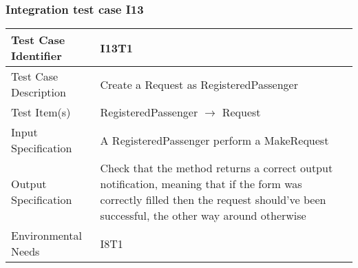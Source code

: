 		\subsubsection{Integration test case I13}
		\begin{center}
			\begin{tabular}{ |l p{10cm}| } \hline
				Test Case Identifier & I13T1 \\ \hline
				Test Case Description & Create a Request as RegisteredPassenger \\ \hline
				Test Item(s) & RegisteredPassenger $\rightarrow$ Request \\ \hline
				Input Specification & A RegisteredPassenger perform a MakeRequest \\ \hline
				Output Specification & Check that the method returns a correct output notification, meaning that if the form was correctly filled then
				the request should've been successful, the other way around otherwise\\ \hline
				Environmental Needs & I8T1 \\ \hline
			\end{tabular}
		\end{center}

